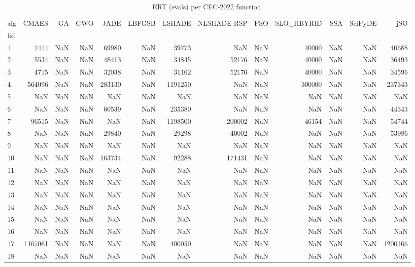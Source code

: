 \begin{table}
\caption{ERT (evals) per CEC-2022 function.}
\label{tab:ert_cec2022}
\begin{tabular}{lrrrrrrrrrrrr}
\toprule
alg & CMAES & GA & GWO & JADE & LBFGSB & LSHADE & NLSHADE-RSP & PSO & SLO_HBYRID & SSA & SciPyDE & jSO \\
fid &  &  &  &  &  &  &  &  &  &  &  &  \\
\midrule
1 & 7414 & NaN & NaN & 69980 & NaN & 39773 & NaN & NaN & 40000 & NaN & NaN & 40688 \\
2 & 5534 & NaN & NaN & 48413 & NaN & 34845 & 52176 & NaN & 40000 & NaN & NaN & 36493 \\
3 & 4715 & NaN & NaN & 32038 & NaN & 31162 & 52176 & NaN & 40000 & NaN & NaN & 34596 \\
4 & 564096 & NaN & NaN & 283130 & NaN & 1191250 & NaN & NaN & 300000 & NaN & NaN & 237343 \\
5 & NaN & NaN & NaN & NaN & NaN & NaN & NaN & NaN & NaN & NaN & NaN & NaN \\
6 & NaN & NaN & NaN & 60539 & NaN & 235380 & NaN & NaN & NaN & NaN & NaN & 44343 \\
7 & 96515 & NaN & NaN & NaN & NaN & 1198500 & 200002 & NaN & 46154 & NaN & NaN & 54744 \\
8 & NaN & NaN & NaN & 29840 & NaN & 29298 & 40002 & NaN & NaN & NaN & NaN & 53986 \\
9 & NaN & NaN & NaN & NaN & NaN & NaN & NaN & NaN & NaN & NaN & NaN & NaN \\
10 & NaN & NaN & NaN & 163734 & NaN & 92288 & 171431 & NaN & NaN & NaN & NaN & NaN \\
11 & NaN & NaN & NaN & NaN & NaN & NaN & NaN & NaN & NaN & NaN & NaN & NaN \\
12 & NaN & NaN & NaN & NaN & NaN & NaN & NaN & NaN & NaN & NaN & NaN & NaN \\
13 & NaN & NaN & NaN & NaN & NaN & NaN & NaN & NaN & NaN & NaN & NaN & NaN \\
14 & NaN & NaN & NaN & NaN & NaN & NaN & NaN & NaN & NaN & NaN & NaN & NaN \\
15 & NaN & NaN & NaN & NaN & NaN & NaN & NaN & NaN & NaN & NaN & NaN & NaN \\
16 & NaN & NaN & NaN & NaN & NaN & NaN & NaN & NaN & NaN & NaN & NaN & NaN \\
17 & 1167061 & NaN & NaN & NaN & NaN & 400050 & NaN & NaN & NaN & NaN & NaN & 1200166 \\
18 & NaN & NaN & NaN & NaN & NaN & NaN & NaN & NaN & NaN & NaN & NaN & NaN \\

\end{tabular}
\end{table}
